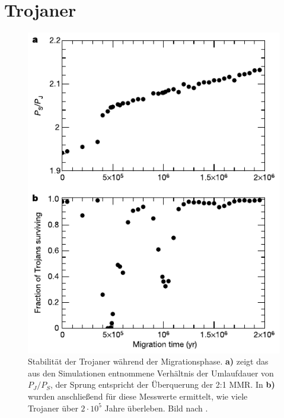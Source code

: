 \documentclass[12pt,a4paper,twoside]{article}
\begin{document}
\FloatBarrier
\section{Trojaner}\label{Trojaner}
\newcommand{\PJS}{P_J/P_S}

\begin{figure}
\centering 
\includegraphics[scale=1]{img/Morbidelli2005-1}
\caption{Stabilität der Trojaner während der Migrationsphase. \textbf{a)} zeigt das aus den Simulationen entnommene Verhältnis der Umlaufdauer von $\PJS$, der Sprung entspricht der Überquerung der 2:1 MMR. In \textbf{b)} wurden anschließend für diese Messwerte ermittelt, wie viele Trojaner über $2\cdot10^5$ Jahre überleben. Bild nach \cite{Morbidelli2005}.}
\label{fig:Trojanerstabilitaet}
\end{figure}
\end{document}
